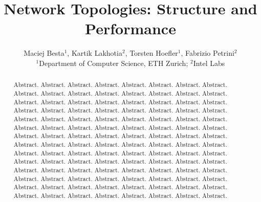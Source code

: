 \documentclass[lettersize,journal]{IEEEtran}
\begin{document}
\title{Network Topologies: Structure and Performance}

\author{Maciej Besta$^1$, Kartik Lakhotia$^2$, Torsten Hoefler$^1$, Fabrizio Petrini$^2$\vspace{0.5em}\\
$^1$Department of Computer Science, ETH Zurich; $^2$Intel Labs}

\maketitle
\IEEEpeerreviewmaketitle

\begin{abstract}
%
Abstract.  Abstract.  Abstract.  Abstract.  Abstract.  Abstract.  Abstract.
Abstract.  Abstract.  Abstract.  Abstract.  Abstract.  Abstract.  Abstract.
Abstract.  Abstract.  Abstract.  Abstract.  Abstract.  Abstract.  Abstract.
Abstract.  Abstract.  Abstract.  Abstract.  Abstract.  Abstract.  Abstract.
Abstract.  Abstract.  Abstract.  Abstract.  Abstract.  Abstract.  Abstract.
Abstract.  Abstract.  Abstract.  Abstract.  Abstract.  Abstract.  Abstract.
Abstract.  Abstract.  Abstract.  Abstract.  Abstract.  Abstract.  Abstract.
Abstract.  Abstract.  Abstract.  Abstract.  Abstract.  Abstract.  Abstract.
Abstract.  Abstract.  Abstract.  Abstract.  Abstract.  Abstract.  Abstract.
Abstract.  Abstract.  Abstract.  Abstract.  Abstract.  Abstract.  Abstract.
Abstract.  Abstract.  Abstract.  Abstract.  Abstract.  Abstract.  Abstract.
Abstract.  Abstract.  Abstract.  Abstract.  Abstract.  Abstract.  Abstract.
Abstract.  Abstract.  Abstract.  Abstract.  Abstract.  Abstract.  Abstract.
Abstract.  Abstract.  Abstract.  Abstract.  Abstract.  Abstract.  Abstract.
Abstract.  Abstract.  Abstract.  Abstract.  Abstract.  Abstract.  Abstract.
Abstract.  Abstract.  Abstract.  Abstract.  Abstract.  Abstract.  Abstract.
%
\end{abstract}












\end{document}
